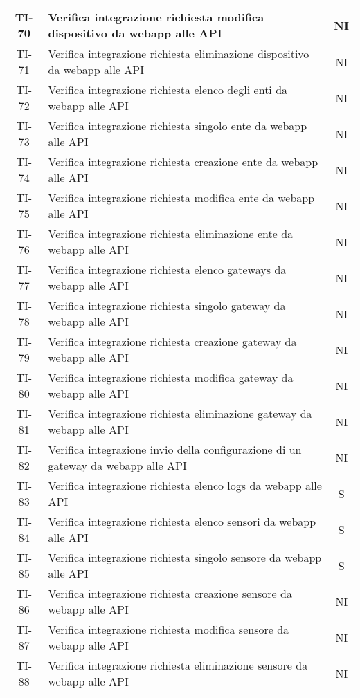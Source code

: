 \begin{center}
\begin{longtable}{|c|p{12cm}|c|}
			\hline
			TI-70 & Verifica integrazione richiesta modifica dispositivo da webapp alle API & NI \\
			\hline
			TI-71 & Verifica integrazione richiesta eliminazione dispositivo da webapp alle API & NI \\
			\hline
			TI-72 & Verifica integrazione richiesta elenco degli enti da webapp alle API & NI \\
			\hline
			TI-73 & Verifica integrazione richiesta singolo ente da webapp alle API & NI \\
			\hline
			TI-74 & Verifica integrazione richiesta creazione ente da webapp alle API & NI \\
			\hline
			TI-75 & Verifica integrazione richiesta modifica ente da webapp alle API & NI \\
			\hline
			TI-76 & Verifica integrazione richiesta eliminazione ente da webapp alle API & NI \\
			\hline
			TI-77 & Verifica integrazione richiesta elenco gateways da webapp alle API & NI \\
			\hline
			TI-78 & Verifica integrazione richiesta singolo gateway da webapp alle API & NI \\
			\hline
			TI-79 & Verifica integrazione richiesta creazione gateway da webapp alle API & NI \\
			\hline
			TI-80 & Verifica integrazione richiesta modifica gateway da webapp alle API & NI \\
			\hline
			TI-81 & Verifica integrazione richiesta eliminazione gateway da webapp alle API & NI \\
			\hline
			TI-82 & Verifica integrazione invio della configurazione di un gateway da webapp alle API & NI \\
			\hline
			TI-83 & Verifica integrazione richiesta elenco logs da webapp alle API & S \\
			\hline
			TI-84 & Verifica integrazione richiesta elenco sensori da webapp alle API & S \\
			\hline
			TI-85 & Verifica integrazione richiesta singolo sensore da webapp alle API & S \\
			\hline
			TI-86 & Verifica integrazione richiesta creazione sensore da webapp alle API & NI \\
			\hline
			TI-87 & Verifica integrazione richiesta modifica sensore da webapp alle API & NI \\
			\hline
			TI-88 & Verifica integrazione richiesta eliminazione sensore da webapp alle API & NI \\

\end{longtable}
\end{center}
